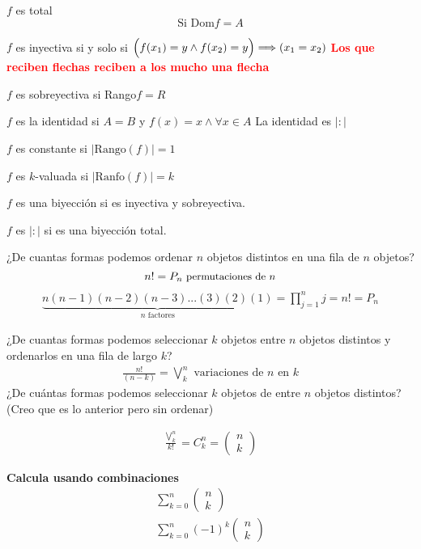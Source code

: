\documentclass[12pt, twoside]{article}
\begin{document}
$f$ es total
\[\text{Si Dom}f=A\]

$f$ es inyectiva si y solo si $\Big{(}f(x_1)=y\wedge f(x_2)=y\Big{)}\Longrightarrow(x_1=x_2)$
\textcolor{red}{ \textbf{Los que reciben flechas reciben a los mucho una flecha}}

$f$ es sobreyectiva si Rango$f=R$

$f$ es la identidad si $A=B$ y $f(x)=x \wedge \forall x\in A$
La identidad es $|:|$

$f$ es constante si $|\text{Rango}(f)|=1$

$f$ es $k$-valuada si $|\text{Ranfo}(f)|=k$

$f$ es una biyección si es inyectiva y sobreyectiva.

$f$ es $|:|$ si es una biyección total.

¿De cuantas formas podemos ordenar $n$ objetos distintos en una fila de $n$ objetos?
{\Huge
	\[n!=P_n\text{\small\ permutaciones de $n$}\]
}
\begin{align*}
	\underbrace{n(n-1)(n-2)(n-3)...(3)(2)(1)}_{\text{$n$ factores}}
	= \prod^n_{j=1}j=n!=P_n
\end{align*}

¿De cuantas formas podemos seleccionar $k$ objetos entre $n$ objetos distintos y
ordenarlos en una fila de largo $k$?
\begin{align*}
	\frac{n!}{(n-k)} = \bigvee^n_k \text{\ variaciones de $n$ en $k$}
\end{align*}
¿De cuántas formas podemos seleccionar $k$ objetos de entre $n$ objetos distintos?
(Creo que es lo anterior pero sin ordenar)

\begin{align*}
	\frac{\bigvee^n_k}{k!}= C^n_k =
	\begin{pmatrix}
		n\\
		k
	\end{pmatrix}
\end{align*}

\textbf{Calcula usando combinaciones }
\begin{align*}
	\sum^n_{k=0} \begin{pmatrix}
		n\\
		k
	\end{pmatrix}\\
	\sum^n_{k=0}(-1)^k
	\begin{pmatrix}
		n\\
		k
	\end{pmatrix}
\end{align*}
\end{document}
